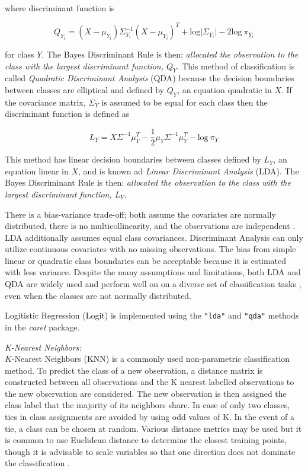 \documentclass[12pt,]{article}
\begin{document}
where discriminant function is

\[
Q_{Y_i} = (X - \mu_{Y_i}) \Sigma^{-1}_{Y_i} (X - \mu_{Y_i})^T + \text{log} \vert \Sigma_{Y_i} \vert - 2\text{log} ~\pi_{Y_i}   \tag{5}
\]

for class \(Y\). The Bayes Discriminant Rule is then: \emph{allocated
the observation to the class with the largest discriminant function,
\(Q_Y\)}. This method of classification is called \emph{Quadratic
Discriminant Analysis} (QDA) because the decision boundaries between
classes are elliptical and defined by \(Q_Y\), an equation quadratic in
\(X\). If the covariance matrix, \(\Sigma_Y\) is assumed to be equal for
each class then the discriminant function is defined as

\[
L_Y = X \Sigma^{-1} \mu_Y^T -\frac{1}{2}\mu_Y \Sigma^{-1} \mu_Y^T  - \text{log} ~\pi_Y     \tag{6}
\]

This method has linear decision boundaries between classes defined by
\(L_Y\), an equation linear in \(X\), and is known ad \emph{Linear
Discriminant Analysis} (LDA). The Bayes Discriminant Rule is then:
\emph{allocated the observation to the class with the largest
discriminant function, \(L_Y\)}.

There is a bias-variance trade-off; both assume the covariates are
normally distributed, there is no multicollinearity, and the
observations are independent \autocite{cover_geometrical_1965}. LDA
additionally assumes equal class covariances. Discriminant Analysis can
only utilize continuous covariates with no missing observations. The
bias from simple linear or quadratic class boundaries can be acceptable
because it is estimated with less variance. Despite the many assumptions
and limitations, both LDA and QDA are widely used and perform well on on
a diverse set of classification tasks \autocite{hastie_elements_2009},
even when the classes are not normally distributed.

Logitistic Regression (Logit) is implemented using the \texttt{"lda"}
and \texttt{"qda"} methods in the \emph{caret} package.

\emph{K-Nearest Neighbors:}\\
\(K\)-Nearest Neighbors (KNN) is a commonly used non-parametric
classification method. To predict the class of a new observation, a
distance matrix is constructed between all observations and the K
nearest labelled observations to the new observation are considered. The
new observation is then assigned the class label that the majority of
its neighbors share. In case of only two classes, ties in class
assignments are avoided by using odd values of K. In the event of a tie,
a class can be chosen at random. Various distance metrics may be used
but it is common to use Euclidean distance to determine the closest
training points, though it is advisable to scale variables so that one
direction does not dominate the classification
\autocite[pp.456]{hastie_elements_2009}.
\end{document}
